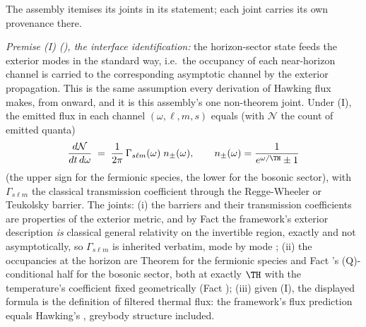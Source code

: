 The assembly itemises its joints in its statement; each joint carries its own provenance there.

\emph{Premise (I) (), the interface identification:} the horizon-sector state feeds the exterior modes in the standard way, i.e.\ the occupancy of each near-horizon channel is carried to the corresponding asymptotic channel by the exterior propagation. This is the same assumption every derivation of Hawking flux makes, from \cite{Hawking1975} onward, and it is this assembly's one non-theorem joint. Under (I), the emitted flux in each channel $(\omega, \ell, m, s)$ equals (with $\mathcal{N}$ the count of emitted quanta)
\[
\frac{d\mathcal{N}}{dt\,d\omega} \;=\; \frac{1}{2\pi}\,\Gamma_{s\ell m}(\omega)\; n_\pm(\omega), \qquad
n_\pm(\omega) = \frac{1}{e^{\omega/\TH} \pm 1}
\]
(the upper sign for the fermionic species, the lower for the bosonic sector), with $\Gamma_{s\ell m}$ the classical transmission coefficient through the Regge-Wheeler or Teukolsky barrier. The joints: (i) the barriers and their transmission coefficients are properties of the exterior metric, and by Fact  the framework's exterior description \emph{is} classical general relativity on the invertible region, exactly and not asymptotically, so $\Gamma_{s\ell m}$ is inherited verbatim, mode by mode \cite{ReggeWheeler1957, Teukolsky1973}; (ii) the occupancies at the horizon are Theorem  for the fermionic species and Fact 's (Q)-conditional half for the bosonic sector, both at exactly $\TH$ with the temperature's coefficient fixed geometrically (Fact ); (iii) given (I), the displayed formula is the definition of filtered thermal flux: the framework's flux prediction equals Hawking's \cite{Hawking1975, Page1976}, greybody structure included.
